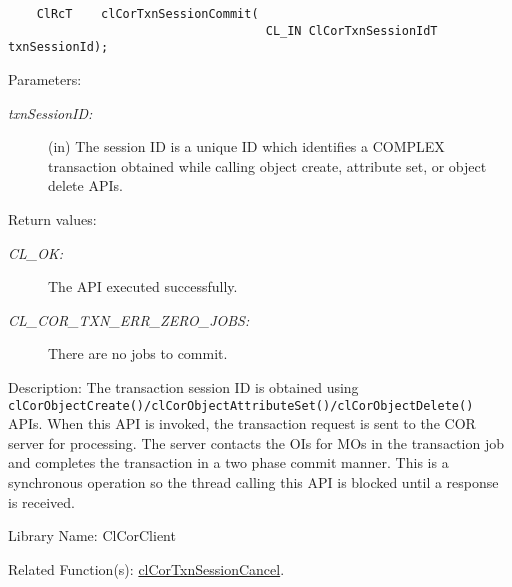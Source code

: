 \begin{flushleft}
\begin{Desc}
\footnotesize\begin{verbatim}    ClRcT    clCorTxnSessionCommit(
                          			CL_IN ClCorTxnSessionIdT txnSessionId);
\end{verbatim}
\normalsize
\end{Desc}
\begin{Desc}
\item[Parameters:]
\begin{description}
\item[{\em txn\-Session\-ID:}](in) The session ID is a unique ID which identifies a COMPLEX transaction obtained while calling object 
create, attribute set, or object delete APIs.\end{description}
\end{Desc}
\begin{Desc}
\item[Return values:]
\begin{description}
\item[{\em CL\_\-OK:}]The API executed successfully. \item[{\em CL\_\-COR\_\-TXN\_\-ERR\_\-ZERO\_\-JOBS:}]There are no jobs to commit.\end{description}
\end{Desc}
\begin{Desc}
\item[Description:]The transaction session ID is obtained using {\tt{clCorObjectCreate()/clCorObjectAttributeSet()/clCorObjectDelete()}} APIs. 
When this API is invoked, the transaction request is sent to the COR server for processing. The server contacts the OIs for MOs in 
the transaction job and completes the transaction in a two phase commit manner. This is a synchronous operation so the thread calling this API is 
blocked until a response is received.\end{Desc}
\begin{Desc}
\item[Library Name:]Cl\-Cor\-Client\end{Desc}
\begin{Desc}
\item[Related Function(s):]\hyperlink{pagecor141}{cl\-Cor\-Txn\-Session\-Cancel}. \end{Desc}
\newpage



\end{flushleft}
